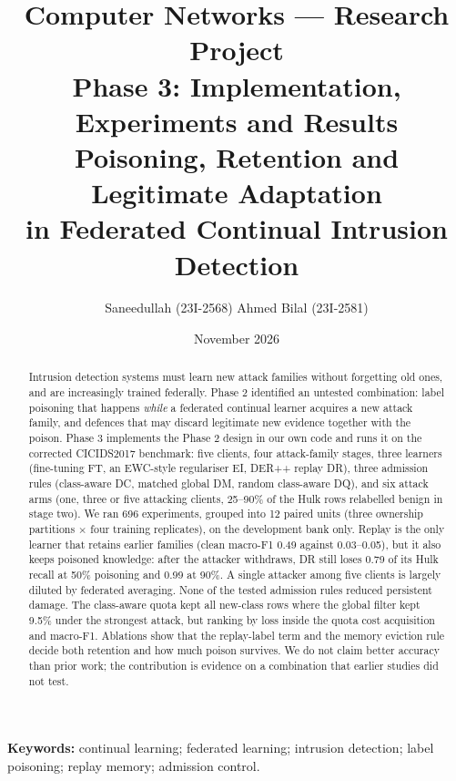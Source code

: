 \documentclass[10pt,a4paper]{article}
\title{\textbf{Computer Networks --- Research Project}\\[4pt]
\large Phase 3: Implementation, Experiments and Results\\[8pt]
\Large Poisoning, Retention and Legitimate Adaptation\\in Federated Continual Intrusion Detection}
\author{Saneedullah (23I-2568) \qquad Ahmed Bilal (23I-2581)}
\date{November 2026}
\begin{document}
\maketitle

\begin{abstract}
Intrusion detection systems must learn new attack families without forgetting old ones, and are increasingly trained federally. Phase 2 identified an untested combination: label poisoning that happens \emph{while} a federated continual learner acquires a new attack family, and defences that may discard legitimate new evidence together with the poison. Phase 3 implements the Phase 2 design in our own code and runs it on the corrected CICIDS2017 benchmark: five clients, four attack-family stages, three learners (fine-tuning FT, an EWC-style regulariser EI, DER++ replay DR), three admission rules (class-aware DC, matched global DM, random class-aware DQ), and six attack arms (one, three or five attacking clients, 25--90\% of the Hulk rows relabelled benign in stage two). We ran 696 experiments, grouped into 12 paired units (three ownership partitions $\times$ four training replicates), on the development bank only. Replay is the only learner that retains earlier families (clean macro-F1 0.49 against 0.03--0.05), but it also keeps poisoned knowledge: after the attacker withdraws, DR still loses 0.79 of its Hulk recall at 50\% poisoning and 0.99 at 90\%. A single attacker among five clients is largely diluted by federated averaging. None of the tested admission rules reduced persistent damage. The class-aware quota kept all new-class rows where the global filter kept 9.5\% under the strongest attack, but ranking by loss inside the quota cost acquisition and macro-F1. Ablations show that the replay-label term and the memory eviction rule decide both retention and how much poison survives. We do not claim better accuracy than prior work; the contribution is evidence on a combination that earlier studies did not test.
\end{abstract}
\noindent\textbf{Keywords:} continual learning; federated learning; intrusion detection; label poisoning; replay memory; admission control.

\end{document}
